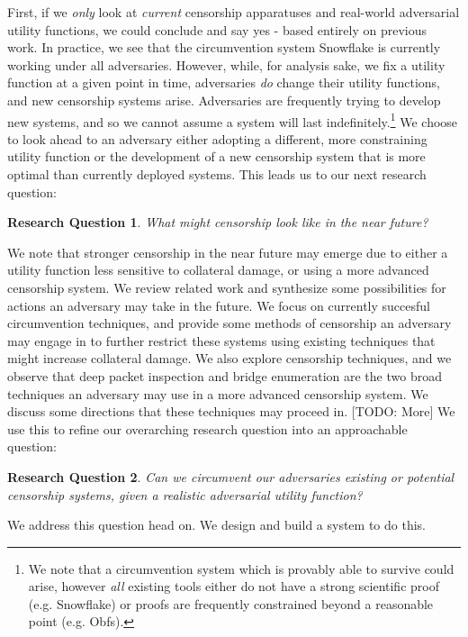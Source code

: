\documentclass[12pt]{report}
\newtheorem{question}{Research Question}
\begin{document}
First, if we \emph{only} look at \emph{current} censorship apparatuses and real-world adversarial utility functions, we could conclude and say yes - based entirely on previous work. In practice, we see that the circumvention system Snowflake is currently working under all adversaries. However, while, for analysis sake, we fix a utility function at a given point in time, adversaries \emph{do} change their utility functions, and new censorship systems arise. Adversaries are frequently trying to develop new systems, and so we cannot assume a system will last indefinitely.\footnote{We note that a circumvention system which is provably able to survive could arise, however \emph{all} existing tools either do not have a strong scientific proof (e.g. Snowflake) or proofs are frequently constrained beyond a reasonable point (e.g. Obfs).} We choose to look ahead to an adversary either adopting a different, more constraining utility function or the development of a new censorship system that is more optimal than currently deployed systems. This leads us to our next research question:

\begin{question}
What might censorship look like in the near future?
\end{question}

We note that stronger censorship in the near future may emerge due to either a utility function less sensitive to collateral damage, or using a more advanced censorship system. We review related work and synthesize some possibilities for actions an adversary may take in the future. We focus on currently succesful circumvention techniques, and provide some methods of censorship an adversary may engage in to further restrict these systems using existing techniques that might increase collateral damage. We also explore censorship techniques, and we observe that deep packet inspection and bridge enumeration are the two broad techniques an adversary may use in a more advanced censorship system. We discuss some directions that these techniques may proceed in. [TODO: More] We use this to refine our overarching research question into an approachable question:

\begin{question}
Can we circumvent our adversaries existing or potential censorship systems, given a realistic adversarial utility function?
\end{question}

We address this question head on. We design and build a system to do this.
\end{document}
